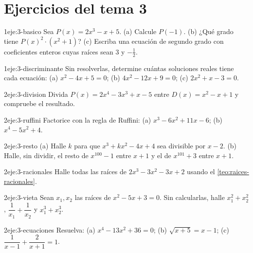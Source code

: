 \section*{Ejercicios del tema 3}

\begin{ejercicio}{1}{eje:3-basico}
Sea $P(x)=2x^3-x+5$. (a) Calcule $P(-1)$. (b) ¿Qué grado tiene $P(x)^2\cdot(x^2+1)$? (c) Escriba una ecuación de segundo grado con coeficientes enteros cuyas raíces sean $3$ y $-\frac12$.
\end{ejercicio}

\begin{ejercicio}{1}{eje:3-discriminante}
Sin resolverlas, determine cuántas soluciones reales tiene cada ecuación: (a) $x^2-4x+5=0$; (b) $4x^2-12x+9=0$; (c) $2x^2+x-3=0$.
\end{ejercicio}

\begin{ejercicio}{2}{eje:3-division}
Divida $P(x)=2x^4-3x^3+x-5$ entre $D(x)=x^2-x+1$ y compruebe el resultado.
\end{ejercicio}

\begin{ejercicio}{2}{eje:3-ruffini}
Factorice con la regla de Ruffini: (a) $x^3-6x^2+11x-6$; (b) $x^4-5x^2+4$.
\end{ejercicio}

\begin{ejercicio}{2}{eje:3-resto}
(a) Halle $k$ para que $x^3+kx^2-4x+4$ sea divisible por $x-2$. (b) Halle, sin dividir, el resto de $x^{100}-1$ entre $x+1$ y el de $x^{101}+3$ entre $x+1$.
\end{ejercicio}

\begin{ejercicio}{2}{eje:3-racionales}
Halle todas las raíces de $2x^3-3x^2-3x+2$ usando el \cref{teo:raices-racionales}.
\end{ejercicio}

\begin{ejercicio}{2}{eje:3-vieta}
Sean $x_1,x_2$ las raíces de $x^2-5x+3=0$. Sin calcularlas, halle $x_1^2+x_2^2$, $\dfrac1{x_1}+\dfrac1{x_2}$ y $x_1^3+x_2^3$.
\end{ejercicio}

\begin{ejercicio}{2}{eje:3-ecuaciones}
Resuelva: (a) $x^4-13x^2+36=0$; (b) $\sqrt{x+5}=x-1$; (c) $\dfrac1{x-1}+\dfrac2{x+1}=1$.
\end{ejercicio}

